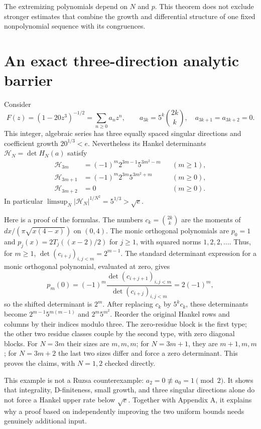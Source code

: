 \documentclass[11pt,a4paper]{article}
\theoremstyle{remark}\newtheorem{remark}[theorem]{Remark}
\begin{document}
The extremizing polynomials depend on $N$ and $p$. This theorem does not
exclude stronger estimates that combine the growth and differential
structure of one fixed nonpolynomial sequence with its congruences.

\section{An exact three-direction analytic barrier}

Consider
\[
 F(z)=(1-20z^3)^{-1/2}=\sum_{n\ge0}a_nz^n,
 \qquad a_{3k}=5^k\binom{2k}{k},\quad a_{3k+1}=a_{3k+2}=0.
\]
This integer, algebraic series has three equally spaced singular directions
and coefficient growth $20^{1/3}<e$. Nevertheless its Hankel determinants
$\mathcal H_N=\det H_N(a)$ satisfy
\begin{align*}
 \mathcal H_{3m}&=(-1)^m2^{3m-1}5^{3m^2-m} &&(m\ge1),\\
 \mathcal H_{3m+1}&=(-1)^m2^{3m}5^{3m^2+m} &&(m\ge0),\\
 \mathcal H_{3m+2}&=0 &&(m\ge0).
\end{align*}
In particular $\limsup_N|\mathcal H_N|^{1/N^2}=5^{1/3}>\sqrt e$.

Here is a proof of the formulas. The numbers $c_k=\binom{2k}{k}$ are the
moments of $dx/(\pi\sqrt{x(4-x)})$ on $(0,4)$.
The monic orthogonal polynomials are $p_0=1$ and
$p_j(x)=2T_j((x-2)/2)$ for $j\ge1$, with squared norms $1,2,2,\ldots$.
Thus, for $m\ge1$, $\det(c_{i+j})_{i,j<m}=2^{m-1}$.
The standard determinant expression for a monic orthogonal polynomial,
evaluated at zero, gives
\[
 p_m(0)=(-1)^m\frac{\det(c_{i+j+1})_{i,j<m}}{\det(c_{i+j})_{i,j<m}}
 =2(-1)^m,
\]
so the shifted determinant is $2^m$. After replacing $c_k$ by $5^kc_k$,
these determinants become $2^{m-1}5^{m(m-1)}$ and $2^m5^{m^2}$.
Reorder the original Hankel rows and columns by their indices modulo three.
The zero-residue block is the first type; the other two residue classes
couple by the second type, with zero diagonal blocks. For $N=3m$ their sizes
are $m,m,m$; for $N=3m+1$, they are $m+1,m,m$; for $N=3m+2$ the last two
sizes differ and force a zero determinant. This proves the claims, with
$N=1,2$ checked directly.

This example is not a Ruzsa counterexample: $a_2=0\not\equiv a_0=1\pmod2$.
It shows that integrality, D-finiteness, small growth, and three singular
directions alone do not force a Hankel upper rate below $\sqrt e$.
Together with Appendix A, it explains why a proof based on independently
improving the two uniform bounds needs genuinely additional input.
\end{document}
